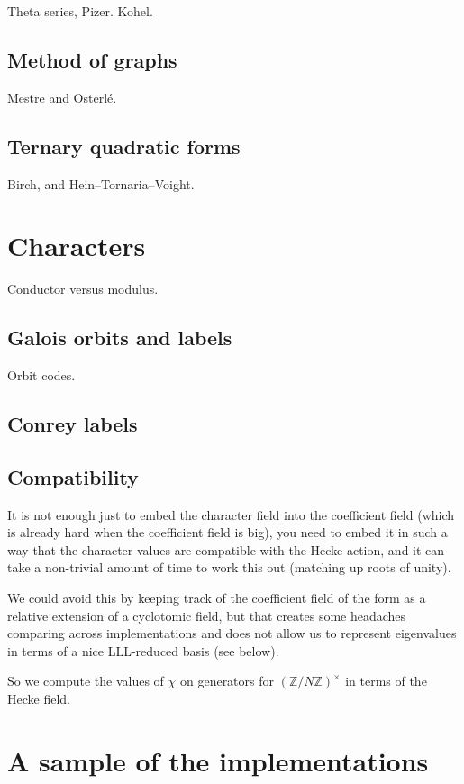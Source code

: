 \documentclass[11pt]{amsart}
\numberwithin{equation}{subsection}
\theoremstyle{plain}
\theoremstyle{definition}
\newcommand{\Z}{\mathbb{Z}}
\begin{document}
Theta series, Pizer.  Kohel.  

\subsection{Method of graphs}

Mestre and Osterl\'e.  

\subsection{Ternary quadratic forms}

Birch, and Hein--Tornaria--Voight.

\section{Characters} \label{sec:chars}

Conductor versus modulus.

\subsection{Galois orbits and labels}

Orbit codes.

\subsection{Conrey labels}

\subsection{Compatibility}

It is not enough just to embed the character field into the coefficient field (which is already hard when the coefficient field is big), you need to embed it in such a way that the character values are compatible with the Hecke action, and it can take a non-trivial amount of time to work this out (matching up roots of unity).

We could avoid this by keeping track of the coefficient field of the form as a relative extension of a cyclotomic field, but that creates some headaches comparing across implementations and does not allow us to represent eigenvalues in terms of a nice LLL-reduced basis (see below).  

So we compute the values of $\chi$ on generators for $(\Z/N\Z)^\times$ in terms of the Hecke field.

\section{A sample of the implementations} \label{sec:implementations}
\end{document}
